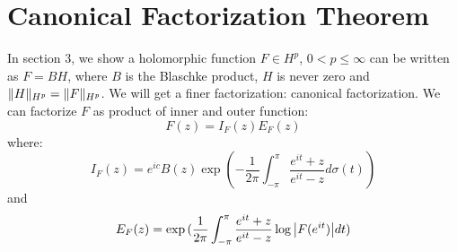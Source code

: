 % 
\section{Canonical Factorization Theorem}
In section 3, we show a holomorphic function $F\in H^p$, $0<p\leq\infty$ can be written as $F=BH$, where $B$ is the Blaschke
product, $H$ is never zero and $\lVert H\rVert_{H^p}=\lVert F\rVert_{H^p}$. We will get a finer factorization: canonical factorization. We
can factorize $F$ as product of inner and outer function:
\begin{equation*}
    F(z)=I_F(z)E_F(z)
\end{equation*}
where:
\begin{equation*}
    I_F(z)=e^{i c}B(z)\exp{(-\frac{1}{2\pi}\int_{-\pi}^{\pi}{\frac{e^{it}+z}{e^{it}-z}d\sigma(t)})}
\end{equation*}
and
\begin{equation*}
    E_F(z)=\exp{(\frac{1}{2\pi}\int_{-\pi}^{\pi}{\frac{e^{it}+z}{e^{it}-z}\log{\left\lvert F(e^{it})\right\rvert}d t})}
\end{equation*}
